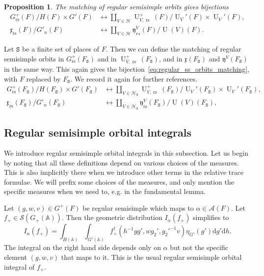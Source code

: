 \documentclass[letterpaper,11pt]{amsart}
\newcommand{\fx}{\mathfrak{x}}
\newcommand{\fy}{\mathfrak{y}}
\newcommand{\bA}{\mathbb{A}}
\newcommand{\cA}{\mathcal{A}}
\newcommand{\cH}{\mathcal{H}}
\newcommand{\cS}{\mathcal{S}}
\newcommand{\rd}{\mathrm{d}}
\newcommand{\tS}{\mathtt{S}}
\newcommand{\<}{\negthickspace}
\DeclareMathOperator{\U}{U}
\DeclareMathOperator{\rs}{rs}
\theoremstyle{definition}
\theoremstyle{plain}
\newtheorem{prop}[definition]{Proposition}
\theoremstyle{remark}
\numberwithin{equation}{section}
\begin{document}
\begin{prop}    \label{prop:regular_ss_orbits_matching}
The matching of regular semisimple orbits gives bijections
    \begin{equation}    \label{eq:regular_ss_orbits_matching}
    \begin{aligned}
     G^+_{\rs}(F)/H(F) \times G'(F) &\leftrightarrow \coprod_{V \in \cH}
    \U_{V, \rs}^+(F) /\U_V'(F) \times \U_V'(F),\\
    \fx_{\rs}(F)/G'_n(F) &\leftrightarrow \coprod_{V \in \cH} \fy^V_{rs}(F)/\U(V)(F).
    \end{aligned}
    \end{equation}
\end{prop}

Let $\tS$ be a finite set of places of $F$. Then we can define the matching
of regular semisimple orbits in $G^+_{\rs}(F_\tS)$ and in $\U_{V,
\rs}^+(F_\tS)$, and in $\fx(F_{\tS})$ and $\fy^V(F_{\tS})$ in the same way.
This again gives the bijection~\eqref{eq:regular_ss_orbits_matching}, with
$F$ replaced by $F_{\tS}$. We record it again for further references.
    \begin{equation}    \label{eq:matching}
    \begin{aligned}
     G^+_{\rs}(F_{\tS})/H(F_{\tS}) \times G'(F_{\tS}) &\leftrightarrow \coprod_{V \in \cH_\tS}
     \U_{V, \rs}^+(F_\tS) /\U_V'(F_\tS) \times \U_V'(F_\tS),\\
    \fx_{\rs}(F_{\tS})/G'_n(F_{\tS}) &\leftrightarrow
    \coprod_{V \in \cH_\tS} \fy^V_{\rs}(F_{\tS})/\U(V)(F_{\tS}),
    \end{aligned}
    \end{equation}






\subsection{Regular semisimple orbital integrals}
We introduce regular semisimple orbital integrals in this subsection. Let us begin by noting that all these definitions depend on various choices of the measures. This is also implicitly there when we introduce other terms in the relative trace formulae. We will prefix some choices of the measures, and only mention the specific measures when we need to, e.g. in the fundamental lemma.

Let $(g, w, v) \in G^+(F)$ be regular semisimple which maps to $\alpha
\in \cA(F)$. Let $f_+ \in \cS(G_+(\bA))$. Then the geometric distribution
$I_{\alpha}(f_+)$ simplifies to
    \begin{equation}    \label{eq:global_orb_GL}
    I_{\alpha}(f_+) = \int_{H(\bA)}\int_{G'(\bA)}
    f_+^\dag(h^{-1} g g', w g_2', g_2'^{-1} v)
    \eta_{G'}(g') \rd g' \rd h.
    \end{equation}
The integral on the right hand side depends only on $\alpha$ but not the
specific element $(g, w, v)$ that maps to it. This is the usual regular
semisimple orbital integral of $f_+$.
\end{document}
